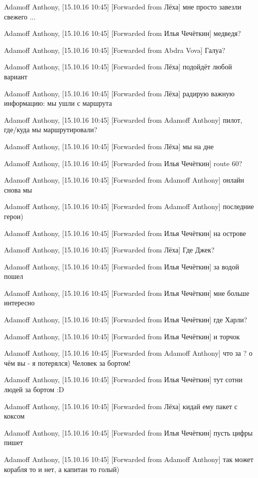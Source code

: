 Adamoff Anthony, [15.10.16 10:45]
[Forwarded from Лёха]
мне просто завезли свежего ...

Adamoff Anthony, [15.10.16 10:45]
[Forwarded from Илья Чечёткин]
медведя?

Adamoff Anthony, [15.10.16 10:45]
[Forwarded from Abdra Vova]
Галуа?

Adamoff Anthony, [15.10.16 10:45]
[Forwarded from Лёха]
подойдёт любой вариант

Adamoff Anthony, [15.10.16 10:45]
[Forwarded from Лёха]
радирую важную информацию: мы ушли с маршрута

Adamoff Anthony, [15.10.16 10:45]
[Forwarded from Adamoff Anthony]
пилот, где/куда мы маршрутировали?

Adamoff Anthony, [15.10.16 10:45]
[Forwarded from Лёха]
мы на дне

Adamoff Anthony, [15.10.16 10:45]
[Forwarded from Илья Чечёткин]
route 60?

Adamoff Anthony, [15.10.16 10:45]
[Forwarded from Adamoff Anthony]
онлайн снова мы

Adamoff Anthony, [15.10.16 10:45]
[Forwarded from Adamoff Anthony]
последние герои)

Adamoff Anthony, [15.10.16 10:45]
[Forwarded from Илья Чечёткин]
на острове

Adamoff Anthony, [15.10.16 10:45]
[Forwarded from Лёха]
Где Джек?

Adamoff Anthony, [15.10.16 10:45]
[Forwarded from Илья Чечёткин]
за водой пошел

Adamoff Anthony, [15.10.16 10:45]
[Forwarded from Илья Чечёткин]
мне больше интересно

Adamoff Anthony, [15.10.16 10:45]
[Forwarded from Илья Чечёткин]
где Харли?

Adamoff Anthony, [15.10.16 10:45]
[Forwarded from Илья Чечёткин]
и торчок

Adamoff Anthony, [15.10.16 10:45]
[Forwarded from Adamoff Anthony]
что за ? о чём вы - я потерялся) Человек за бортом!

Adamoff Anthony, [15.10.16 10:45]
[Forwarded from Илья Чечёткин]
тут сотни людей за бортом :D

Adamoff Anthony, [15.10.16 10:45]
[Forwarded from Лёха]
кидай ему пакет с коксом

Adamoff Anthony, [15.10.16 10:45]
[Forwarded from Илья Чечёткин]
пусть цифры пишет

Adamoff Anthony, [15.10.16 10:45]
[Forwarded from Adamoff Anthony]
так может корабля то и нет, а капитан то голый)

